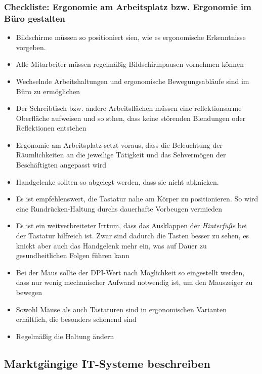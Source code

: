 \documentclass[a4paper, 12pt]{report}
\begin{document}
\subsubsection{Checkliste: Ergonomie am Arbeitsplatz bzw. Ergonomie im Büro
gestalten}

\begin{itemize}
    \item Bildschirme müssen so positioniert sien, wie es ergonomische
	Erkenntnisse vorgeben.
    \item Alle Mitarbeiter müssen regelmäßig Bildschirmpausen vornehmen können
    \item Wechselnde Arbeitshaltungen und ergonomische Bewegungsabläufe sind im
	Büro zu ermöglichen
    \item Der Schreibtisch bzw. andere Arbeitsflächen müssen eine
	reflektionsarme Oberfläche aufweisen und so sthen, dass keine störenden
	Blendungen oder Reflektionen entstehen
    \item Ergonomie am Arbeitsplatz setzt voraus, dass die Beleuchtung der
	Räumlichkeiten an die jeweilige Tätigkeit und das Sehvermögen der
	Beschäftigten angepasst wird
    \item Handgelenke sollten so abgelegt werden, dass sie nicht abknicken.
    \item Es ist empfehlenswert, die Tastatur nahe am Körper zu positionieren.
	So wird eine Rundrücken-Haltung durchs dauerhafte Vorbeugen vermieden
    \item Es ist ein weitverbreiteter Irrtum, dass das Ausklappen der
	\emph{Hinterfüße} bei der Tastatur hilfreich ist. Zwar sind dadurch die
	Tasten besser zu sehen, es knickt aber auch das Handgelenk mehr ein, was
	auf Dauer zu gesundheitlichen Folgen führen kann
    \item Bei der Maus sollte der DPI-Wert nach Möglichkeit so eingestellt
	werden, dass nur wenig mechanischer Aufwand notwendig ist, um den
	Mauszeiger zu bewegen
    \item Sowohl Mäuse als auch Tastaturen sind in ergonomischen Varianten
	erhältlich, die besonders schonend sind
    \item Regelmäßig die Haltung ändern
\end{itemize}

\subsection{Marktgängige IT-Systeme beschreiben}
\end{document}
